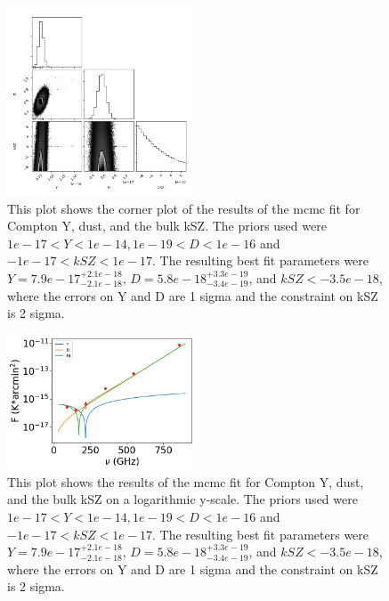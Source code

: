 \documentclass{princeton_astro_thesis}
\begin{document}
\begin{figure}[h]
\centering
\includegraphics[width=0.5\textwidth]{../BulkkSZplot.png}
\caption{This plot shows the corner plot of the results of the mcmc fit for Compton Y, dust, and the bulk kSZ. The priors used were $ 1e-17 < Y < 1e-14, 1e-19< D < 1e-16$ and $-1e-17 < kSZ <1e-17.$ The resulting best fit parameters were $Y=7.9e-17^{+2.1e-18}_{-2.1e-18}$, $D=5.8e-18^{+3.3e-19}_{-3.4e-19}$, and $kSZ<-3.5e-18$, where the errors on Y and D are 1 sigma and the constraint on kSZ is 2 sigma.}
\end{figure}

\begin{figure}[h]
\centering
\includegraphics[width=0.5\textwidth]{../redmapper_apfluxes_kSZfitlog.png}
\caption{This plot shows  the results of the mcmc fit for Compton Y, dust, and the bulk kSZ on a logarithmic y-scale. The priors used were $ 1e-17 < Y < 1e-14, 1e-19< D < 1e-16$ and $-1e-17 < kSZ <1e-17.$ The resulting best fit parameters were $Y=7.9e-17^{+2.1e-18}_{-2.1e-18}$, $D=5.8e-18^{+3.3e-19}_{-3.4e-19}$, and $kSZ<-3.5e-18$, where the errors on Y and D are 1 sigma and the constraint on kSZ is 2 sigma.} %
\end{figure}
\end{document}

